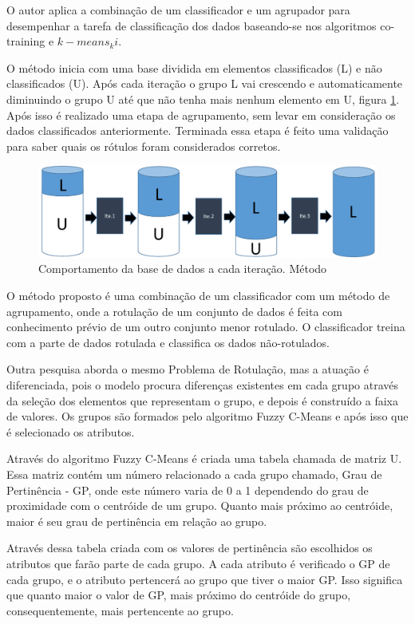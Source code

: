 O autor aplica a combinação de um classificador e um agrupador para desempenhar  a tarefa de classificação dos dados baseando-se nos algoritmos co-training e $k-means_ki$.


O método inicia com uma base dividida em elementos classificados (L) e não classificados (U). Após cada iteração o grupo L vai crescendo e automaticamente diminuindo o grupo U até que não tenha mais nenhum elemento em U, figura  \ref{fig:modeloVicente}. Após isso é realizado uma etapa de agrupamento, sem levar em consideração os dados classificados anteriormente. Terminada essa etapa é feito uma validação para saber quais os rótulos foram considerados corretos.
\begin{figure}[!h]
        \centering
        \includegraphics[scale=0.4]{figs/modeloVicente.png}
        \caption{Comportamento da base de dados a cada iteração. Método \cite{Metodo2015}} \label{fig:modeloVicente}
\end{figure}

O método proposto é uma combinação de um classificador com um método de agrupamento, onde a rotulação de um conjunto de dados é feita com conhecimento prévio de um outro conjunto menor rotulado. O classificador treina com a parte de dados rotulada e classifica os dados não-rotulados.


Outra pesquisa \cite{Filho2015}  aborda o mesmo Problema de Rotulação, mas a atuação é diferenciada, pois o modelo procura diferenças existentes em cada grupo através da seleção dos elementos que representam o grupo, e depois é construído a faixa de valores. Os grupos são formados pelo algoritmo Fuzzy C-Means e após isso que é selecionado os atributos. 

Através do algoritmo Fuzzy C-Means é criada uma tabela chamada de matriz U. Essa matriz contém um número relacionado a cada grupo chamado, Grau de Pertinência - GP, onde este número varia de 0 a 1 dependendo do grau de proximidade com o centróide de um grupo. Quanto mais próximo ao centróide, maior é seu grau de pertinência em relação ao grupo.

Através dessa tabela criada com os valores de pertinência são escolhidos os atributos que farão parte de cada grupo. A cada atributo é verificado o GP de cada grupo, e o atributo pertencerá ao grupo que tiver o maior GP. Isso significa que quanto maior o valor de GP, mais próximo do centróide do grupo, consequentemente, mais pertencente ao grupo. 


